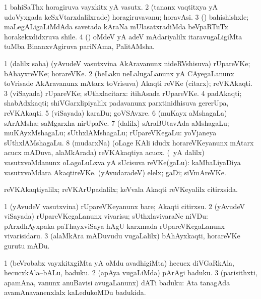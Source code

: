 \bentry
{}
\gl{\nA}
\bmng
\bnum
\num{1} bahiSaThx horagiruva vayxkitx yA vasutx. 
\num{2} (tananx vaqtitxya yA udoVyxgada keSxVtarxdalilxrade) horagiruvavanu; horavAsi. 
\num{3} (\BUvi) bahishishxle; maLegALigaLiMdAda savetada kAraNa mUlasatxradiMda beVpaRTuTx horakekxdidxruva shile. 
\num{4} (\saMshA) oMdeV yA adeV mAdariyalilx itaravugaLigiMta tuMba BinanxvAgiruva pariNAma, PalitAMsha. 
\enum
\emng
\eentry

\bentry
{}
\gl{\nA}
\bmng
\bnum
\num{1} (\bava dalilx saha) (yAvudeV vasutxvina AkAravanunx nideRVshisuva) rUpareVKe; bAhayxreVKe; horareVKe. 
\num{2} (beLaku neLalugaLanunx yA CAyegaLanunx toVrisade AkAravanunx mAtarx toVrisuva) Akaqti reVKe (citarx); reVKAkaqti. 
\num{3} (viSayada) rUpareVKe; sUthxlacitarx:  itihAsada rUpareVKe. 
\num{4} padAkaqti; shabAdxkaqti; shiVGarxlipiyalilx padavanunx parxtinidhisuva gererUpa, reVKAkaqti. 
\num{5} (viSayada) karaDu; goVSAvxre. 
\num{6} (muKayx aMshagaLa) sArAMsha; saMgarxha nirUpaNe. 
\num{7} (\bava dalilx) sAraBUtavAda aMshagaLu; muKAyxMshagaLu; sUthxlAMshagaLu; rUpareVKegaLu:  yoVjaneya sUthxlAMshagaLu. 
\num{8} (mudarxNa) (oLage KAli idudx horareVKeyanunx mAtarx acucx mADuva, alaMkArada) reVKAkaqtiya acucx. 
 (\Eva\ yA \bava dalilx) 
\banum
{} vasutxvoMdanunx oLagoLuLxva yA sUcisuva reVKe(gaLu):  kaMbaLiyaDiya vasutxvoMdara AkaqtireVKe. 
 (yAvudaradeV) elelx; gaDi; siVmAreVKe. 
\eanum
\numie
\enum
\emng

\noindent
\gl{\pagu}
\bmng
{} reVKAkaqtiyalilx; reVKArUpadalilx; keVvala Akaqti reVKeyalilx citirxsida. 
\emng
\eentry

\bentry
{}
\gl{\sakirx}
\bmng
\bnum
\num{1} (yAvudeV vasutxvina) rUpareVKeyanunx bare; Akaqti citirxsu. 
\num{2} (yAvudeV viSayada) rUpareVKegaLanunx vivarisu; sUthxlavivaraNe niVDu:  pArxdhAyxpaka paThayxviSaya hAgU karxmada rUpareVKegaLanunx vivarisidaru. 
\num{3} (alaMkAra mADuvudu \mo vugaLalilx) bAhAyxkaqti, horareVKe gurutu mADu. 
\enum
\emng
\eentry

\bentry
{}
\gl{\sakirx}
\bmng
\bnum
\num{1} (beVrobabx vayxkitxgiMta yA oMdu avadhigiMta) hecucx diVGaRkAla, hecucxkAla--bALu, baduku. 
\num{2} (apAya \mo vugaLiMda) pArAgi baduku. 
\num{3} (parisithxti, apamAna, \mo vanunx anuBavisi avugaLanunx) dATi baduku:  Ata tanagAda avamAnavanenxlalx kaLedukoMDu badukida. 
\enum
\emng
\eentry


